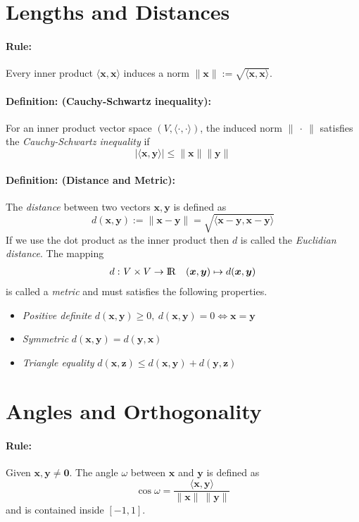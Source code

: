\documentclass[12pt]{article}
\newcommand{\R}{{\rm I\!R}}
\newcommand{\bx}{{\bm{x}}}
\newcommand{\by}{{\bm{y}}}
\newcommand{\bz}{{\bm{z}}}
\newcommand{\0}[0]{\bm{0}}
\newcommand{\ipr}[1]{\langle #1 \rangle}
\newcommand{\norm}[1]{\lVert#1\rVert}
\newcommand{\xdefinition}[2]{\paragraph{\colorbox{#1!30}{\textbf{Definition:}} (#2):}}
\newcommand{\xrule}[1]{\paragraph{\colorbox{#1!30}{\textbf{Rule:}}}}
\begin{document}
\section{Lengths and Distances}

\xrule{red} Every inner product $\ipr{\bx, \bx}$ induces a norm $\norm{\bx} := \sqrt{\ipr{\bx, \bx}}$.

\xdefinition{red}{Cauchy-Schwartz inequality} For an inner product vector space $(V, \ipr{\cdot, \cdot})$, the induced norm $\norm{\ \cdot \ }$ satisfies the \textit{Cauchy-Schwartz inequality} if
%
\begin{equation}
	| \ipr{\bx, \by} | \leqslant \norm{\bx} \norm{\by}
\end{equation}

\xdefinition{blue}{Distance and Metric} The \textit{distance} between two vectors $\bx, \by$ is defined as
%
\begin{equation}
	d(\bx, \by) := \norm{\bx - \by} = \sqrt{\ipr{\bx - \by, \bx - \by}}
\end{equation}
%
If we use the dot product as the inner product then $d$ is called the \textit{Euclidian distance}. The mapping
%
\begin{equation}
\begin{aligned}
	d : \ &V \times V \rightarrow \R
	      &(\bx, \by) \mapsto d(\bx, \by)
\end{aligned}
\end{equation}
%
is called a \textit{metric} and must satisfies the following properties.
%
\begin{itemize}
	\item \textit{Positive definite} $d(\bx, \by) \geqslant 0, \ d(\bx, \by) = 0 \iff \bx = \by$
	\item \textit{Symmetric} $d(\bx, \by)= d(\by, \bx)$
	\item \textit{Triangle equality} $d(\bx, \bz) \leqslant d(\bx, \by) + d(\by, \bz)$
\end{itemize}

\section{Angles and Orthogonality}

\xrule{red} Given $\bx, \by \neq \0$. The angle $\omega$ between $\bx$ and $\by$ is defined as
%
\begin{equation}
	\cos \omega = \frac{\ipr{\bx, \by}}{\norm{\bx} \ \norm{\by}}
\end{equation}
%
and is contained inside $[-1, 1]$.
\end{document}
